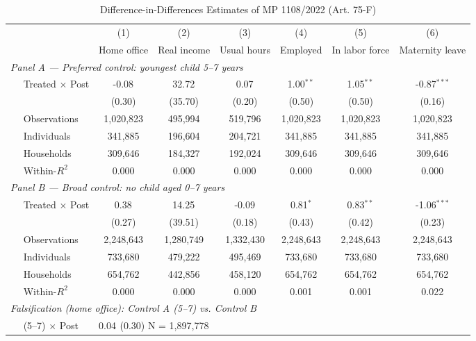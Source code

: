 \begin{table}[htbp]
\centering
\caption{Difference-in-Differences Estimates of MP 1108/2022 (Art. 75-F)}
\label{tab:did_main}
\small
\begin{tabular}{lcccccc}
\toprule
 & (1) & (2) & (3) & (4) & (5) & (6) \\
 & Home office & Real income & Usual hours & Employed & In labor force & Maternity leave \\
\midrule
\multicolumn{7}{l}{\textit{Panel A --- Preferred control: youngest child 5--7 years}} \\
$\quad$ Treated $\times$ Post & -0.08$^{}$ & 32.72$^{}$ & 0.07$^{}$ & 1.00$^{**}$ & 1.05$^{**}$ & -0.87$^{***}$ \\
 & (0.30) & (35.70) & (0.20) & (0.50) & (0.50) & (0.16) \\
$\quad$ Observations & 1,020,823 & 495,994 & 519,796 & 1,020,823 & 1,020,823 & 1,020,823 \\
$\quad$ Individuals & 341,885 & 196,604 & 204,721 & 341,885 & 341,885 & 341,885 \\
$\quad$ Households & 309,646 & 184,327 & 192,024 & 309,646 & 309,646 & 309,646 \\
$\quad$ Within-$R^2$ & 0.000 & 0.000 & 0.000 & 0.000 & 0.000 & 0.000 \\
\midrule
\multicolumn{7}{l}{\textit{Panel B --- Broad control: no child aged 0--7 years}} \\
$\quad$ Treated $\times$ Post & 0.38$^{}$ & 14.25$^{}$ & -0.09$^{}$ & 0.81$^{*}$ & 0.83$^{**}$ & -1.06$^{***}$ \\
 & (0.27) & (39.51) & (0.18) & (0.43) & (0.42) & (0.23) \\
$\quad$ Observations & 2,248,643 & 1,280,749 & 1,332,430 & 2,248,643 & 2,248,643 & 2,248,643 \\
$\quad$ Individuals & 733,680 & 479,222 & 495,469 & 733,680 & 733,680 & 733,680 \\
$\quad$ Households & 654,762 & 442,856 & 458,120 & 654,762 & 654,762 & 654,762 \\
$\quad$ Within-$R^2$ & 0.000 & 0.000 & 0.000 & 0.001 & 0.001 & 0.022 \\
\midrule
\multicolumn{7}{l}{\textit{Falsification (home office): Control A (5--7) vs. Control B}} \\
$\quad$ (5--7) $\times$ Post & \multicolumn{6}{l}{0.04$^{}$ \; (0.30) \quad N = 1,897,778} \\
\bottomrule
\end{tabular}
\begin{tablenotes}

\end{tablenotes}
\end{table}
